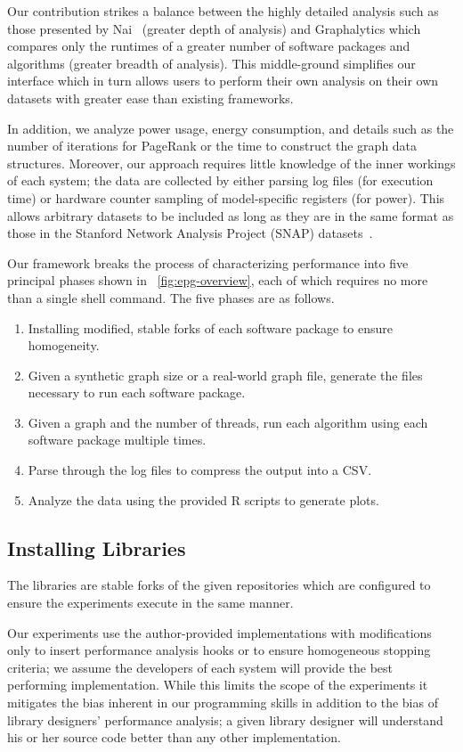 \documentclass[conference]{IEEEtran}
\begin{document}
Our contribution strikes a balance between the highly detailed analysis such as those presented by Nai~\cite{Nai:2016:architectural} (greater depth of analysis) and Graphalytics which compares only the runtimes of a greater number of software packages and algorithms (greater breadth of analysis). This middle-ground simplifies our interface which in turn allows users to perform their own analysis on their own datasets with greater ease than existing frameworks.

In addition, we analyze  power usage, energy consumption, and details such as the number of iterations for PageRank or the time to construct the graph data structures. Moreover, our approach requires little knowledge of the inner workings of each system; the data are collected by either parsing log files (for execution time) or hardware counter sampling of model-specific registers (for power). This allows arbitrary datasets to be included as long as they are in the same format as those in the Stanford Network Analysis Project (SNAP) datasets~\cite{snapnets}.

Our framework breaks the process of characterizing performance into five principal phases shown in \figurename~\ref{fig:epg-overview}, each of which requires no more than a single shell command. The five phases are as follows.
\begin{enumerate}
	\item Installing modified, stable forks of each software package to ensure homogeneity.
	\item Given a synthetic graph size or a real-world graph file, generate the files necessary to run each software package.
	\item Given a graph and the number of threads, run each algorithm using each software package multiple times.
	\item Parse through the log files to compress the output into a CSV.
	\item Analyze the data using the provided R scripts to generate plots.
\end{enumerate}

\subsection{Installing Libraries}
The libraries are stable forks of the given repositories which are configured to ensure the experiments execute in the same manner.

Our experiments use the author-provided implementations with modifications only to insert performance analysis hooks or to ensure homogeneous stopping criteria; we assume the developers of each system will provide the best performing implementation. While this limits the scope of the experiments it mitigates the bias inherent in our programming skills in addition to the bias of library designers' performance analysis; a given library designer will understand his or her source code better than any other implementation.
\end{document}
